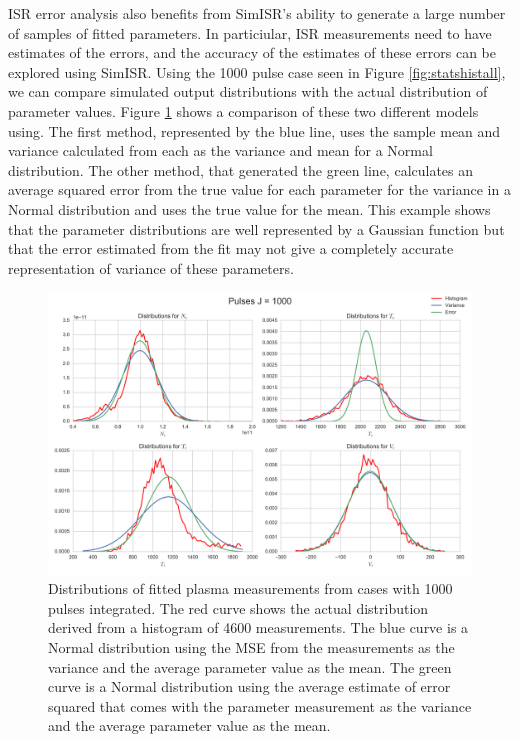 \documentclass[draft,ras]{agutex}
\begin{document}
\begin{article}
ISR error analysis also benefits from SimISR's ability to generate a large number of samples of fitted parameters. In particiular, ISR measurements need to have estimates of the errors, and the accuracy of the estimates of these errors can be explored using SimISR. Using the 1000 pulse case seen in Figure \ref{fig:statshistall}, we can compare simulated output distributions with the actual distribution of parameter values. Figure \ref{fig:statshistsingle} shows a comparison of these two different models using. The first method, represented by the blue line, uses the sample mean and variance calculated from each as the variance and mean for a Normal distribution. The other method, that generated the green line, calculates an average squared error from the true value for each parameter for the variance in a Normal distribution and uses the true value for the mean. 
This example shows that the parameter distributions are well represented by a Gaussian function but that the error estimated from the fit may not give a completely accurate representation of variance of these parameters. 

\begin{figure}[!t]
\centering
\includegraphics[width=5in]{histsingle}
\caption{Distributions of fitted plasma measurements from cases with 1000 pulses integrated. The red curve shows the actual distribution derived from a histogram of 4600 measurements. The blue curve is a Normal distribution using the MSE from the measurements as the variance and the average parameter value as the mean.  The green curve is a Normal distribution using the average estimate of error squared that comes with the parameter measurement as the variance and the average parameter value as the mean.}
\label{fig:statshistsingle}
\end{figure}



\end{article}
\end{document}

